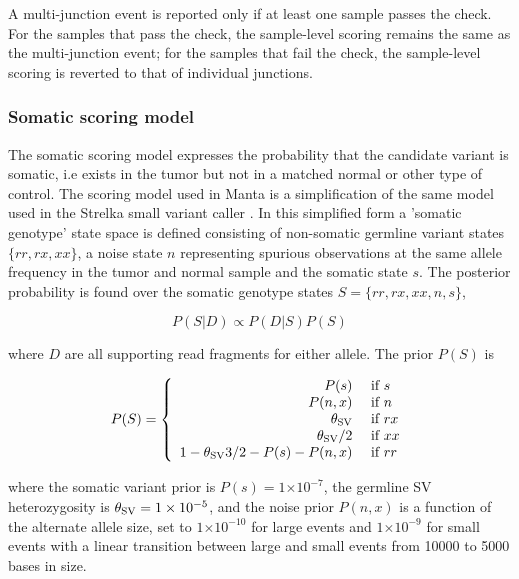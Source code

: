 \documentclass{article}
\newcommand{\e}[1]{\ensuremath{\times 10^{#1}}}
\begin{document}
A multi-junction event is reported only if at least one sample passes the check. For the samples that pass the check, the sample-level scoring remains the same as the multi-junction event; for the samples that fail the check, the sample-level scoring is reverted to that of individual junctions.

\subsubsection{Somatic scoring model}

The somatic scoring model expresses the probability that the candidate variant is somatic, i.e exists in the tumor but not in a matched normal or other type of control. The scoring model used in Manta is a simplification of the same model used in the Strelka small variant caller \cite{strelka2012}. In this simplified form a 'somatic genotype' state space is defined consisting of non-somatic germline variant states $\{rr, rx, xx\}$, a noise state $n$ representing spurious observations at the same allele frequency in the tumor and normal sample and the somatic state $s$. The posterior probability is found over the somatic genotype states $S = \{rr,rx,xx,n,s\}$,

\begin{equation*}
P( S \vert D ) \propto P( D \vert S )  P (S)
\end{equation*}

\noindent
where $D$ are all supporting read fragments for either allele. The prior $P(S)$ is

\begin{equation*}
P ( S ) =
\left\{
\begin{array}{rl}
P ( s )  & \mbox{ if $s$} \\
P ( n , x )  & \mbox{ if $n$} \\
\theta_{\textnormal{SV}}      & \mbox{ if $rx$} \\
\theta_{\textnormal{SV}} / 2  & \mbox{ if $xx$} \\
1 - \theta_{\textnormal{SV}} 3 / 2 - P(s) - P(n,x)  & \mbox{ if $rr$}
\end{array}
\right.
\end{equation*}

\noindent
where the somatic variant prior is $P(s) = 1\e{-7}$, the germline SV heterozygosity is $\thz = 1\e{-5}$, and the noise prior $P(n,x)$ is a function of the alternate allele size, set to $1\e{-10}$ for large events and $1\e{-9}$ for small events with a linear transition between large and small events from 10000 to 5000 bases in size.
\end{document}
